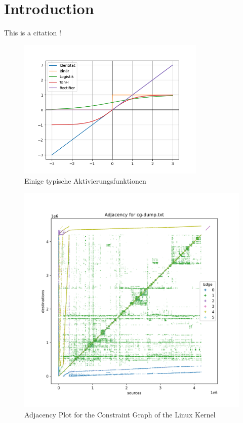 \chapter{Introduction}
This is a citation \autocite{juliani2018unity}!
\begin{figure}
    \centering
    \includegraphics[width=0.8\textwidth]{img/test.png}
    \caption{Einige typische Aktivierungsfunktionen}
    \label{fig:actfn}
\end{figure}

\begin{figure}
    \centering
    \includegraphics[width=1.\textwidth]{img/linux-consg.png}
    \caption{Adjacency Plot for the Constraint Graph of the Linux Kernel}
    \label{fig:linux-consg}
\end{figure}

